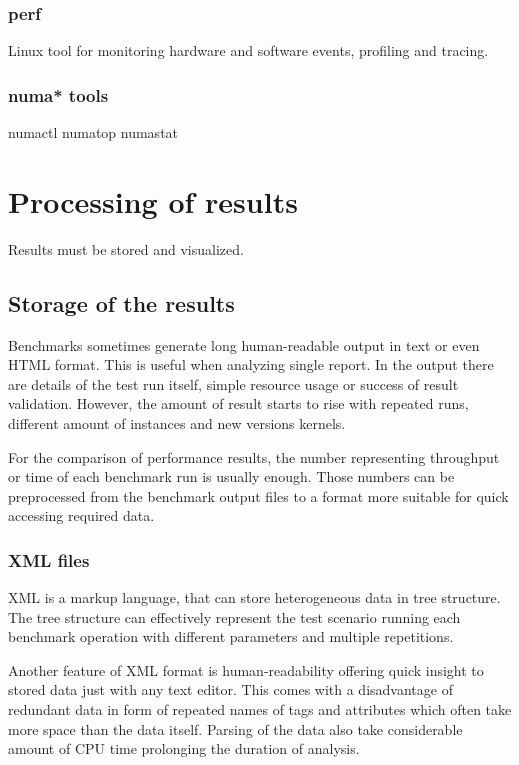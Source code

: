 \subsection{perf}
Linux tool for monitoring hardware and software events, profiling and tracing.

\subsection{numa* tools}
numactl
numatop
numastat



\chapter{Processing of results} \label{ch:processing}
Results must be stored and visualized.

\section{Storage of the results}
Benchmarks sometimes generate long human-readable output in text or even HTML
format. This is useful when analyzing single report. In the output there are details
of the test run itself, simple resource usage or success of result validation.
However, the amount of result starts to rise with repeated runs, different
amount of instances and new versions kernels.

For the comparison of performance results, the number representing throughput or
time of each benchmark run is usually enough. Those numbers can be preprocessed
from the benchmark output files to a format more suitable for quick accessing
required data.

\subsection{XML files}
XML is a markup language, that can store heterogeneous data in tree structure.
The tree structure can effectively represent the test scenario running each
benchmark operation with different parameters and multiple repetitions.

Another feature of XML format is human-readability offering quick insight to stored
data just with any text editor.
This comes with a disadvantage of redundant data in form of repeated names of
tags and attributes which often take more space than the data itself. Parsing of
the data also take considerable amount of CPU time prolonging the duration of
analysis.

